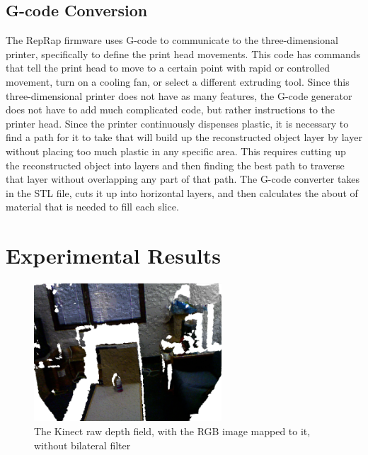 \documentclass[pdftex,10.5pt]{report}
\begin{document}
\subsection{G-code Conversion}
The RepRap firmware uses G-code to communicate to the three-dimensional printer, specifically to define the print head movements. This code has commands that tell the print head to move to a certain point with rapid or controlled movement, turn on a cooling fan, or select a different extruding tool. Since this three-dimensional printer does not have as many features, the G-code generator does not have to add much complicated code, but rather instructions to the printer head. Since the printer continuously dispenses plastic, it is necessary to find a path for it to take that will build up the reconstructed object layer by layer without placing too much plastic in any specific area. This requires cutting up the reconstructed object into layers and then finding the best path to traverse that layer without overlapping any part of that path. The G-code converter takes in the STL file, cuts it up into horizontal layers, and then calculates the about of material that is needed to fill each slice. 

\section{Experimental Results}

\begin{figure}[H]
	\centering
	\includegraphics[width=70mm]{figures/kinectwaterbottle.png}
	\caption{The Kinect raw depth field, with the RGB image mapped to it, without bilateral filter}
	\label{waterbot}
\end{figure}
\end{document}
